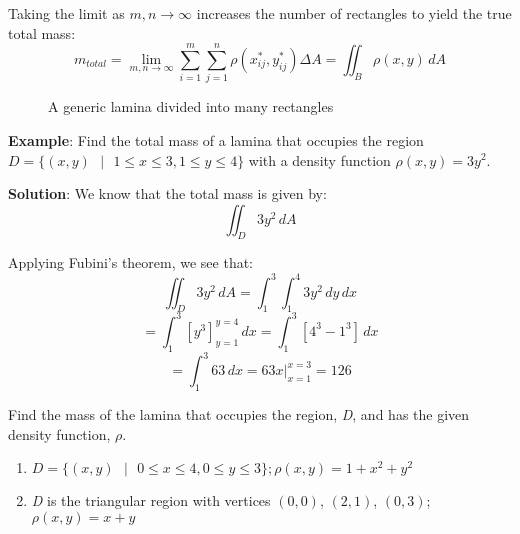 Taking the limit as $m, n \to \infty$ increases the number of rectangles to 
yield the true total mass:
$$m_{total} = \lim_{m, n \to \infty} \sum_{i = 1}^m \sum_{j = 1}^n \rho (x_{ij
}^*, y_{ij}^*) \Delta A = \iint_{\textit{B}} \rho (x, y)\,dA$$

\begin{figure}[htbp]
\centering
    \caption{A generic lamina divided into many rectangles}
    \label{fig:laminagrid}
\end{figure}

\textbf{Example}: Find the total mass of a lamina that occupies the region 
$\textit{D} = \{ \left( x, y \right) \text{ }| \text{ } 1 \leq x \leq 3, 1 
\leq y \leq 4 \}$ with a density function $\rho (x, y) = 3y^2$. 

\textbf{Solution}: We know that the total mass is given by:
$$\iint_{\textit{D}} 3y^2\,dA$$

Applying Fubini's theorem, we see that:
$$\iint_{\textit{D}} 3y^2\,dA = \int_1^3 \int_1^4 3y^2\,dy\,dx$$
$$= \int_1^3 \left[ y^3 \right]_{y = 1}^{y = 4}\,dx = \int_1^3 \left[4^3 - 
1^3 \right]\,dx$$
$$= \int_1^3 63 \,dx = 63x|_{x = 1}^{x = 3} = 126$$

\begin{Exercise}[title = {Finding Total Mass}, label = total_mass]
Find the mass of the lamina that occupies the region, \textit{D}, and has the 
given density function, $\rho$. 
\begin{enumerate}
\item $\textit{D} = \{(x, y)\text{ }|\text{ } 0 \leq x \leq 4, 0 \leq y \leq 3 
\}; \rho (x, y) = 1 + x^2 + y^2$
\item \textit{D} is the triangular region with vertices $(0, 0)$, $(2, 1)$, 
$(0, 3)$; $\rho (x, y) = x + y$
\vspace{50mm}
\end{enumerate}
\end{Exercise}

